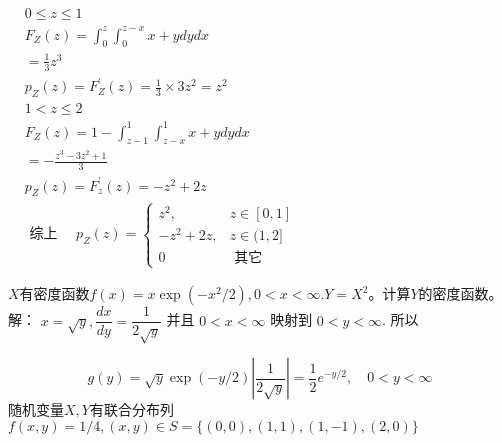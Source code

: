 \documentclass[11pt,addpoints]{exam}
\begin{document}
\begin{questions}
\begin{parts}
	 		$\begin{aligned} & 0 \leq z \leq 1 \\ & F_Z(z)=\int_0^z \int_0^{z-x} x+y d y d x \\ &=\frac{1}{3} z^3 \\ & p_Z(z)=F_Z^{\prime}(z)=\frac{1}{3} \times 3 z^2=z^2 \\ & 1<z \leq 2 \\ & F_Z(z)=1-\int_{z-1}^1 \int_{z-x}^1 x+y d y d x \\ &=-\frac{z^3-3 z^2+1}{3} \\ & p_Z(z)=F_z^{\prime}(z)=-z^2+2 z \\ & \text { 综上 } \quad p_Z(z)=\left\{\begin{array}{cc}z^2, & z \in[0,1] \\ -z^2+2 z, & z \in(1,2] \\ 0 & \text { 其它 }\end{array}\right.\end{aligned}$
	 	\end{parts}
	 	\newpage
	 	\question[10]
	 	$X$有密度函数$f(x) = x\exp(-x ^ 2 / 2), 0 < x < \infty. Y = X ^ 2$。计算$Y$的密度函数。\\
	 	解：
	 	$x=\sqrt{y}, \dfrac{d x}{d y}=\dfrac{1}{2 \sqrt{y}}$ 并且 $0<x<\infty$ 映射到 $0<y<\infty$. 所以
	 	
	 	$$
	 	g(y)=\sqrt{y}\exp(-y / 2)\left|\dfrac{1}{2 \sqrt{y}}\right|=\dfrac{1}{2} e^{-y / 2}, \quad 0<y<\infty
	 	$$
	 	\question
	 	随机变量$X, Y$有联合分布列$f(x, y) = 1 / 4, (x, y) \in S = \{(0, 0), (1, 1), (1, -1), (2, 0)\}$
	\end{questions}
	
\end{document}
